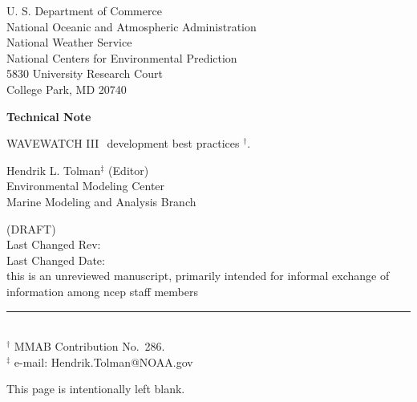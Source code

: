 \documentclass[12pt]{article}
\newcommand{\wwt}{WAVEWATCH III$\:$\textsuperscript\textregistered}
\newcommand{\bpage}{\vfill \pagebreak \strut

\vspace{2.5in} \centerline{This page is intentionally left blank.}}
\begin{document}

\pagestyle{empty}

\strut \vspace{5mm}

\begin{center} 
U. S. Department of Commerce \\
National Oceanic and Atmospheric Administration \\
National Weather Service \\
National Centers for Environmental Prediction \\
5830 University Research Court \\
College Park, MD 20740

\vspace{15mm}

{\bf Technical Note}

\vspace{15mm}

{\large \wwt\ development best practices $^\dag$.}

\vspace{20mm}

Hendrik L. Tolman$^\ddag$ (Editor)
\\
Environmental Modeling Center \\
Marine Modeling and Analysis Branch

\vspace{25mm}

(DRAFT) \\
Last Changed Rev: \SVNRevision \\
Last Changed Date: \SVNDate \\
\vspace{\baselineskip}
\vfill {\sc this is an unreviewed manuscript, primarily
intended for informal exchange of information among ncep staff
members}

\end{center}
\noindent \rule{140mm}{0.5mm} \\
{\small $^\dag$ MMAB Contribution No.~286. \\
$^\ddag$ e-mail: Hendrik.Tolman@NOAA.gov} \\

\bpage

\pagebreak
\end{document}
